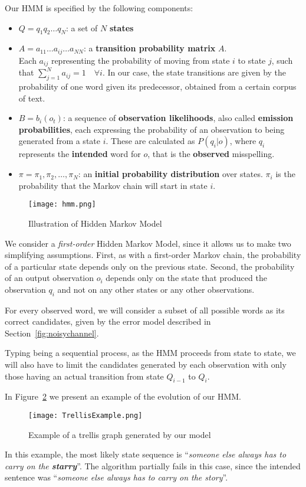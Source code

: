 Our HMM is specified by the following components:
\begin{itemize}
	\item $Q = q_1q_2 \dots q_N$: a set of $N$ \textbf{states}
	\item $A=a_{11}	\dots a_{ij} \dots a_{NN}$: a \textbf{transition probability matrix} $A$. \\ Each $a_{ij}$ 
	representing the probability of moving from state $i$ to state $j$, such that $\sum_{j=1}^N a_{ij}=1 \quad 
	\forall i$. In our case, the state transitions are given by the probability of one word given its predecessor, 
	obtained from a certain corpus of text.
	\item $B = b_i (o_t )$: a sequence of \textbf{observation likelihoods}, also called \textbf{emission 
		probabilities}, each expressing the probability of an observation to being generated from a state $i$. These 
	are calculated as $P(q_i|o)$, where $q_i$ represents the \textbf{intended} word for $o$, that is the \textbf{observed} misspelling.
	\item $\pi = \pi_1,\pi_2,\dots,\pi_N$: an \textbf{initial probability distribution} over states. $\pi_i$ is the 
	probability that the Markov chain will start in state $i$. 
\end{itemize}


\begin{figure}[H]
	\centering
	\texttt{[image: hmm.png]}
	\caption{Illustration of Hidden Markov Model}
	\label{fig:hmm}
\end{figure}

We consider a \textit{first-order} Hidden Markov Model, since it allows us to make two simplifying assumptions. First, 
as with a first-order Markov chain, the probability of a particular state depends only on the previous state. Second, 
the probability of an output observation $o_i$ depends only on the state that produced the observation $q_i$ 
and not on any other states or any other observations.

For every observed word, we will consider a subset of all possible words as its correct candidates, given by 
the error model described in Section~\ref{fig:noisychannel}.

Typing being a sequential process, as the HMM proceeds from state to state, we will also have to limit the 
candidates generated by each observation with only those having an actual transition from state $Q_{i-1}$ to 
$Q_i$.

In Figure~\ref{fig:trellis} we present an example of the evolution of our HMM.
\begin{figure}[H]
	\centering
	\texttt{[image: TrellisExample.png]}
	\caption{Example of a trellis graph generated by our model}
	\label{fig:trellis}
\end{figure}
In this example, the most likely state sequence is “\textsl{someone else always has to carry on the \textbf{starry}}”. 
The algorithm partially fails in this case, since the intended sentence was “\textsl{someone else always has to carry 
on the story}”.


